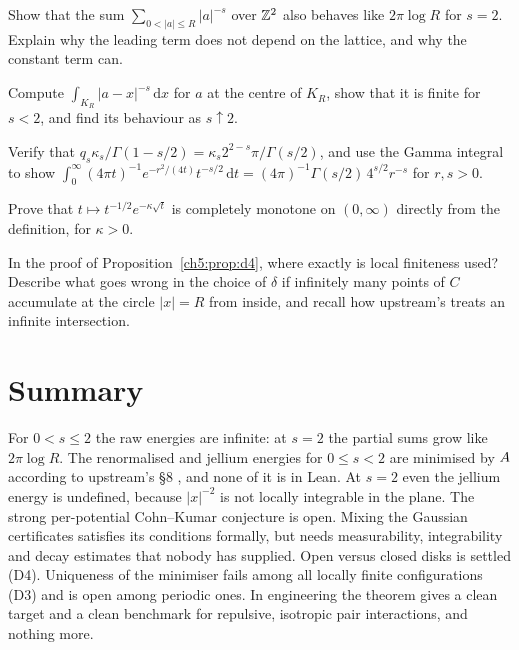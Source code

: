 \begin{exercise}
Show that the sum $\sum_{0<|a|\le R}|a|^{-s}$ over $\mathbb{Z}^2$ also behaves like $2\pi\log R$ for $s=2$. Explain why the
leading term does not depend on the lattice, and why the constant term can.
\end{exercise}

\begin{exercise}
Compute $\int_{K_R}|a-x|^{-s}\,\mathrm{d}x$ for $a$ at the centre of $K_R$, show that it is finite for $s<2$, and
find its behaviour as $s\uparrow2$.
\end{exercise}

\begin{exercise}
Verify that $q_s\kappa_s/\Gamma(1-s/2)=\kappa_s2^{2-s}\pi/\Gamma(s/2)$, and use the Gamma integral to show
$\int_0^\infty(4\pi t)^{-1}e^{-r^2/(4t)}t^{-s/2}\,\mathrm{d}t=(4\pi)^{-1}\Gamma(s/2)\,4^{s/2}r^{-s}$ for $r,s>0$.
\end{exercise}

\begin{exercise}
Prove that $t\mapsto t^{-1/2}e^{-\kappa\sqrt t}$ is completely monotone on $(0,\infty)$ directly from the definition,
for $\kappa>0$.
\end{exercise}

\begin{exercise}
In the proof of Proposition~\ref{ch5:prop:d4}, where exactly is local finiteness used? Describe what goes wrong in the
choice of $\delta$ if infinitely many points of $C$ accumulate at the circle $|x|=R$ from inside, and recall how
upstream's  treats an infinite intersection.
\end{exercise}

\section*{Summary}
For $0<s\le2$ the raw energies are infinite: at $s=2$ the partial sums grow like $2\pi\log R$. The renormalised and
jellium energies for $0\le s<2$ are minimised by $A$ according to upstream's \S8 \tierL{}, and none of it is in
Lean. At $s=2$ even the jellium energy is undefined, because $|x|^{-2}$ is not locally integrable in the plane. The
strong per-potential Cohn--Kumar conjecture is open. Mixing the Gaussian certificates satisfies its conditions
formally, but needs measurability, integrability and decay estimates that nobody has supplied. Open versus closed
disks is settled (D4). Uniqueness of the minimiser fails among all locally finite
configurations (D3) and is open among periodic ones. In engineering the theorem gives a clean target and a clean
benchmark for repulsive, isotropic pair interactions, and nothing more.
